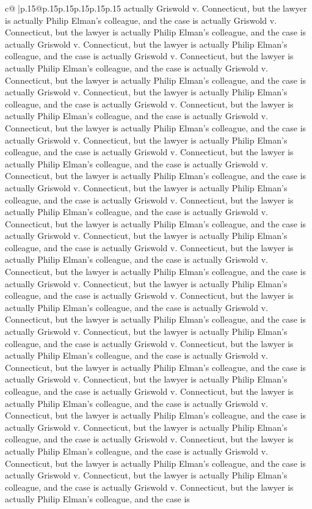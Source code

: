 \documentclass{article}
\begin{document}
{\begin{supertabular}{c@{$\;$}|p{.15\linewidth}@{}p{.15\linewidth}p{.15\linewidth}p{.15\linewidth}p{.15\linewidth}p{.15\linewidth}}
{{{actually Griswold v. Connecticut, but the lawyer is actually Philip Elman's colleague, and the case is actually Griswold v. Connecticut, but the lawyer is actually Philip Elman's colleague, and the case is actually Griswold v. Connecticut, but the lawyer is actually Philip Elman's colleague, and the case is actually Griswold v. Connecticut, but the lawyer is actually Philip Elman's colleague, and the case is actually Griswold v. Connecticut, but the lawyer is actually Philip Elman's colleague, and the case is actually Griswold v. Connecticut, but the lawyer is actually Philip Elman's colleague, and the case is actually Griswold v. Connecticut, but the lawyer is actually Philip Elman's colleague, and the case is actually Griswold v. Connecticut, but the lawyer is actually Philip Elman's colleague, and the case is actually Griswold v. Connecticut, but the lawyer is actually Philip Elman's colleague, and the case is actually Griswold v. Connecticut, but the lawyer is actually Philip Elman's colleague, and the case is actually Griswold v. Connecticut, but the lawyer is actually Philip Elman's colleague, and the case is actually Griswold v. Connecticut, but the lawyer is actually Philip Elman's colleague, and the case is actually Griswold v. Connecticut, but the lawyer is actually Philip Elman's colleague, and the case is actually Griswold v. Connecticut, but the lawyer is actually Philip Elman's colleague, and the case is actually Griswold v. Connecticut, but the lawyer is actually Philip Elman's colleague, and the case is actually Griswold v. Connecticut, but the lawyer is actually Philip Elman's colleague, and the case is actually Griswold v. Connecticut, but the lawyer is actually Philip Elman's colleague, and the case is actually Griswold v. Connecticut, but the lawyer is actually Philip Elman's colleague, and the case is actually Griswold v. Connecticut, but the lawyer is actually Philip Elman's colleague, and the case is actually Griswold v. Connecticut, but the lawyer is actually Philip Elman's colleague, and the case is actually Griswold v. Connecticut, but the lawyer is actually Philip Elman's colleague, and the case is actually Griswold v. Connecticut, but the lawyer is actually Philip Elman's colleague, and the case is actually Griswold v. Connecticut, but the lawyer is actually Philip Elman's colleague, and the case is actually Griswold v. Connecticut, but the lawyer is actually Philip Elman's colleague, and the case is actually Griswold v. Connecticut, but the lawyer is actually Philip Elman's colleague, and the case is actually Griswold v. Connecticut, but the lawyer is actually Philip Elman's colleague, and the case is actually Griswold v. Connecticut, but the lawyer is actually Philip Elman's colleague, and the case is actually Griswold v. Connecticut, but the lawyer is actually Philip Elman's colleague, and the case is actually Griswold v. Connecticut, but the lawyer is actually Philip Elman's colleague, and the case is actually Griswold v. Connecticut, but the lawyer is actually Philip Elman's colleague, and the case is actually Griswold v. Connecticut, but the lawyer is actually Philip Elman's colleague, and the case is }}}
\end{supertabular}}
\end{document}
